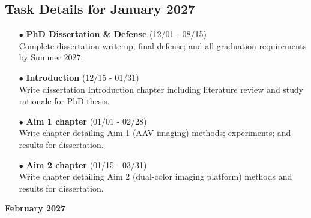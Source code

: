 \documentclass[landscape,a4paper]{article}
\begin{document}
\vspace{0.5cm}
\subsection{Task Details for January 2027}
\begin{itemize}[leftmargin=1cm]
    \item[\textcolor{other}{$\bullet$}] \textbf{PhD Dissertation \& Defense} (12/01 - 08/15)\\ Complete dissertation write-up; final defense; and all graduation requirements by Summer 2027.
    \item[\textcolor{other}{$\bullet$}] \textbf{Introduction} (12/15 - 01/31)\\ Write dissertation Introduction chapter including literature review and study rationale for PhD thesis.
    \item[\textcolor{other}{$\bullet$}] \textbf{Aim 1 chapter} (01/01 - 02/28)\\ Write chapter detailing Aim 1 (AAV imaging) methods; experiments; and results for dissertation.
    \item[\textcolor{other}{$\bullet$}] \textbf{Aim 2 chapter} (01/15 - 03/31)\\ Write chapter detailing Aim 2 (dual-color imaging platform) methods and results for dissertation.
\end{itemize}

\newpage
\pagestyle{empty}

\begin{center}
{\large\textbf{February 2027}}
\end{center}

\vspace{0.5cm}
\end{document}
